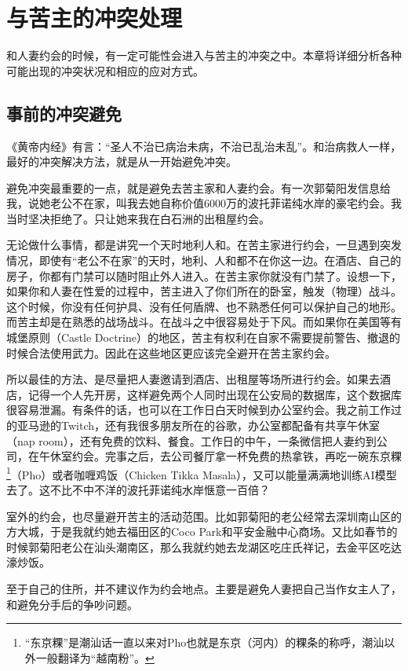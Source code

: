 \chapter{与苦主的冲突处理}

和人妻约会的时候，有一定可能性会进入与苦主的冲突之中。本章将详细分析各种可能出现的冲突状况和相应的应对方式。

\section{事前的冲突避免}

《黄帝内经》有言：``圣人不治已病治未病，不治已乱治未乱''。和治病救人一样，最好的冲突解决方法，就是从一开始避免冲突。

避免冲突最重要的一点，就是避免去苦主家和人妻约会。有一次郭菊阳发信息给我，说她老公不在家，叫我去她自称价值6000万的波托菲诺纯水岸的豪宅约会。我当时坚决拒绝了。只让她来我在白石洲的出租屋约会。

无论做什么事情，都是讲究一个天时地利人和。在苦主家进行约会，一旦遇到突发情况，即使有``老公不在家''的天时，地利、人和都不在你这一边。在酒店、自己的房子，你都有门禁可以随时阻止外人进入。在苦主家你就没有门禁了。设想一下，如果你和人妻在性爱的过程中，苦主进入了你们所在的卧室，触发（物理）战斗。这个时候，你没有任何护具、没有任何盾牌、也不熟悉任何可以保护自己的地形。而苦主却是在熟悉的战场战斗。在战斗之中很容易处于下风。而如果你在美国等有城堡原则（Castle Doctrine）的地区，苦主有权利在自家不需要提前警告、撤退的时候合法使用武力。因此在这些地区更应该完全避开在苦主家约会。

所以最佳的方法、是尽量把人妻邀请到酒店、出租屋等场所进行约会。如果去酒店，记得一个人先开房，这样避免两个人同时出现在公安局的数据库，这个数据库很容易泄漏。有条件的话，也可以在工作日白天时候到办公室约会。我之前工作过的亚马逊的Twitch，还有我很多朋友所在的谷歌，办公室都配备有共享午休室（nap room），还有免费的饮料、餐食。工作日的中午，一条微信把人妻约到公司，在午休室约会。完事之后，去公司餐厅拿一杯免费的热拿铁，再吃一碗东京粿\footnote{``东京粿''是潮汕话一直以来对Pho也就是东京（河内）的粿条的称呼，潮汕以外一般翻译为``越南粉''。}（Pho）或者咖喱鸡饭（Chicken Tikka Masala），又可以能量满满地训练AI模型去了。这不比不中不洋的波托菲诺纯水岸惬意一百倍？

室外的约会，也尽量避开苦主的活动范围。比如郭菊阳的老公经常去深圳南山区的方大城，于是我就约她去福田区的Coco Park和平安金融中心商场。又比如春节的时候郭菊阳老公在汕头潮南区，那么我就约她去龙湖区吃庄氏祥记，去金平区吃达濠炒饭。

至于自己的住所，并不建议作为约会地点。主要是避免人妻把自己当作女主人了，和避免分手后的争吵问题。

